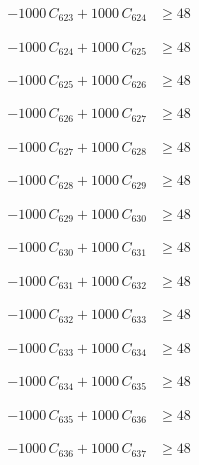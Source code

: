 \documentclass[a4paper,11pt]{article}
\begin{document}
\begin{align}
-1000\,C_{623} + 1000\,C_{624} &\geq 48 \nonumber
\end{align}

\begin{align}
-1000\,C_{624} + 1000\,C_{625} &\geq 48 \nonumber
\end{align}

\begin{align}
-1000\,C_{625} + 1000\,C_{626} &\geq 48 \nonumber
\end{align}

\begin{align}
-1000\,C_{626} + 1000\,C_{627} &\geq 48 \nonumber
\end{align}

\begin{align}
-1000\,C_{627} + 1000\,C_{628} &\geq 48 \nonumber
\end{align}

\begin{align}
-1000\,C_{628} + 1000\,C_{629} &\geq 48 \nonumber
\end{align}

\begin{align}
-1000\,C_{629} + 1000\,C_{630} &\geq 48 \nonumber
\end{align}

\begin{align}
-1000\,C_{630} + 1000\,C_{631} &\geq 48 \nonumber
\end{align}

\begin{align}
-1000\,C_{631} + 1000\,C_{632} &\geq 48 \nonumber
\end{align}

\begin{align}
-1000\,C_{632} + 1000\,C_{633} &\geq 48 \nonumber
\end{align}

\begin{align}
-1000\,C_{633} + 1000\,C_{634} &\geq 48 \nonumber
\end{align}

\begin{align}
-1000\,C_{634} + 1000\,C_{635} &\geq 48 \nonumber
\end{align}

\begin{align}
-1000\,C_{635} + 1000\,C_{636} &\geq 48 \nonumber
\end{align}

\begin{align}
-1000\,C_{636} + 1000\,C_{637} &\geq 48 \nonumber
\end{align}
\end{document}
